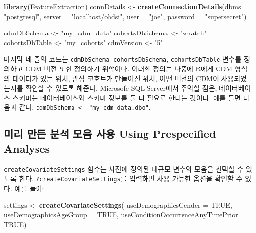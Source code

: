\documentclass[10.5pt]{book}
\newenvironment{Shaded}{\begin{snugshade}}{\end{snugshade}}
\newcommand{\KeywordTok}[1]{\textcolor[rgb]{0.13,0.29,0.53}{\textbf{#1}}}
\newcommand{\DataTypeTok}[1]{\textcolor[rgb]{0.13,0.29,0.53}{#1}}
\newcommand{\StringTok}[1]{\textcolor[rgb]{0.31,0.60,0.02}{#1}}
\newcommand{\OtherTok}[1]{\textcolor[rgb]{0.56,0.35,0.01}{#1}}
\newcommand{\NormalTok}[1]{#1}
\theoremstyle{definition}
\theoremstyle{definition}
\theoremstyle{definition}
\theoremstyle{remark}
\begin{document}
\begin{Shaded}
\begin{Highlighting}[]
\KeywordTok{library}\NormalTok{(FeatureExtraction)}
\NormalTok{connDetails <-}\StringTok{ }\KeywordTok{createConnectionDetails}\NormalTok{(}\DataTypeTok{dbms =} \StringTok{"postgresql"}\NormalTok{,}
                                       \DataTypeTok{server =} \StringTok{"localhost/ohdsi"}\NormalTok{,}
                                       \DataTypeTok{user =} \StringTok{"joe"}\NormalTok{,}
                                       \DataTypeTok{password =} \StringTok{"supersecret"}\NormalTok{)}

\NormalTok{cdmDbSchema <-}\StringTok{ "my_cdm_data"}
\NormalTok{cohortsDbSchema <-}\StringTok{ "scratch"}
\NormalTok{cohortsDbTable <-}\StringTok{ "my_cohorts"}
\NormalTok{cdmVersion <-}\StringTok{ "5"}
\end{Highlighting}
\end{Shaded}

마지막 네 줄의 코드는 \texttt{cdmDbSchema}, \texttt{cohortsDbSchema},
\texttt{cohortsDbTable} 변수를 정의하고 CDM 버전 또한 정의하기 위함이다.
이러한 정의는 나중에 R에게 CDM 형식의 데이터가 있는 위치, 관심 코호트가
만들어진 위치, 어떤 버전의 CDM이 사용되었는지를 확인할 수 있도록 해준다.
Microsofe SQL Server에서 주의할 점은, 데이터베이스 스키마는
데이터베이스와 스키마 정보를 둘 다 필요로 한다는 것이다. 예를 들면
다음과 같다. \texttt{cdmDbSchema\ \textless{}-\ "my\_cdm\_data.dbo"}.

\subsection{미리 만든 분석 모음 사용 Using Prespecified
Analyses}\label{-----using-prespecified-analyses}

\texttt{createCovariateSettings} 함수는 사전에 정의된 대규모 변수의
모음을 선택할 수 있도록 한다. \texttt{?createCovariateSettings}를
입력하면 사용 가능한 옵션을 확인할 수 있다. 예를 들어:

\begin{Shaded}
\begin{Highlighting}[]
\NormalTok{settings <-}\StringTok{ }\KeywordTok{createCovariateSettings}\NormalTok{(}
  \DataTypeTok{useDemographicsGender =} \OtherTok{TRUE}\NormalTok{, }
  \DataTypeTok{useDemographicsAgeGroup =} \OtherTok{TRUE}\NormalTok{, }
  \DataTypeTok{useConditionOccurrenceAnyTimePrior =} \OtherTok{TRUE}\NormalTok{) }
\end{Highlighting}
\end{Shaded}
\end{document}
